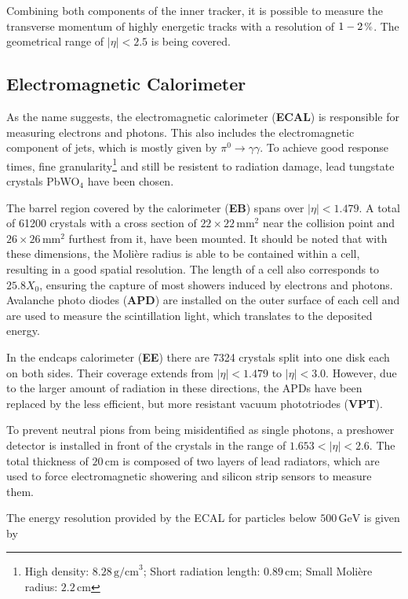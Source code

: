 Combining both components of the inner tracker, it is possible to measure the transverse momentum of highly energetic tracks with a resolution of $1-2\,\pct$. The geometrical range of $|\eta| < 2.5$ is being covered.


\subsection{Electromagnetic Calorimeter}

As the name suggests, the electromagnetic calorimeter (\textbf{ECAL}) is responsible for measuring electrons and photons. This also includes the electromagnetic component of jets, which is mostly given by $\pi^0 \rightarrow \gamma \gamma$. To achieve good response times, fine granularity\footnote{High density: $8.28\,\text{g/cm}^3$; Short radiation length: $0.89\,\text{cm}$; Small Moli\`{e}re radius: $2.2\,\text{cm}$} and still be resistent to radiation damage, lead tungstate crystals PbWO$_4$ have been chosen.

The barrel region covered by the calorimeter (\textbf{EB}) spans over $|\eta| < 1.479$. A total of 61200 crystals with a cross section of $22 \times 22\,\text{mm}^2$ near the collision point and $26 \times 26\,\text{mm}^2$ furthest from it, have been mounted. It should be noted that with these dimensions, the Moli\`{e}re radius is able to be contained within a cell, resulting in a good spatial resolution. The length of a cell also corresponds to $25.8 X_0$, ensuring the capture of most showers induced by electrons and photons. Avalanche photo diodes (\textbf{APD}) are installed on the outer surface of each cell and are used to measure the scintillation light, which translates to the deposited energy.

In the endcaps calorimeter (\textbf{EE}) there are 7324 crystals split into one disk each on both sides. Their coverage extends from $|\eta| < 1.479$ to $|\eta| < 3.0$. However, due to the larger amount of radiation in these directions, the APDs have been replaced by the less efficient, but more resistant vacuum phototriodes (\textbf{VPT}).

To prevent neutral pions from being misidentified as single photons, a preshower detector is installed in front of the crystals in the range of $1.653 < |\eta| < 2.6$. The total thickness of $20\,\text{cm}$ is composed of two layers of lead radiators, which are used to force electromagnetic showering and silicon strip sensors to measure them.

The energy resolution provided by the ECAL for particles below $500\,\text{GeV}$ is given by

